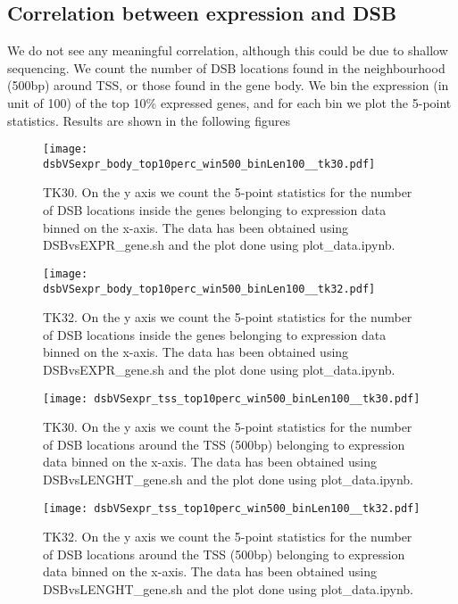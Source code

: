 \documentclass[11pt,a4paper]{article}
\begin{document}
\subsection{Correlation between expression and DSB}
We do not see any meaningful correlation, although this could be due to shallow sequencing. We count the number of DSB locations found in the neighbourhood (500bp) around TSS, or those found in the gene body. We bin the expression (in unit of 100) of the top 10\% expressed genes, and for each bin we plot the 5-point statistics. Results are shown in the following figures

\begin{figure}[hbtp]
\begin{minipage}[t]{0.45\textwidth}
\texttt{[image: dsbVSexpr\_body\_top10perc\_win500\_binLen100\_\_tk30.pdf]}
\caption{TK30. On the y axis we count the 5-point statistics for the number of DSB locations inside the genes belonging to expression data binned on the x-axis. The data has been obtained using DSBvsEXPR{\_}gene.sh and the plot done using plot{\_}data.ipynb.}
\label{fig:dsbVSexpr_body_top10perc_win500_binLen100__tk30}
\end{minipage}
\hspace{\fill}
\begin{minipage}[t]{0.5\textwidth}
\texttt{[image: dsbVSexpr\_body\_top10perc\_win500\_binLen100\_\_tk32.pdf]}
\caption{TK32. On the y axis we count the 5-point statistics for the number of DSB locations inside the genes belonging to expression data binned on the x-axis. The data has been obtained using DSBvsEXPR{\_}gene.sh and the plot done using plot{\_}data.ipynb.}
\label{fig:dsbVSexpr_body_top10perc_win500_binLen100__tk32}
\end{minipage}
\vspace*{0.5cm} %
\begin{minipage}[t]{0.45\textwidth}
\texttt{[image: dsbVSexpr\_tss\_top10perc\_win500\_binLen100\_\_tk30.pdf]}
\caption{TK30. On the y axis we count the 5-point statistics for the number of DSB locations around the TSS (500bp) belonging to expression data binned on the x-axis. The data has been obtained using DSBvsLENGHT{\_}gene.sh and the plot done using plot{\_}data.ipynb.}
\label{fig:dsbVSexpr_body_top10perc_win500_binLen100__tk30}
\end{minipage}
\hspace{\fill}
\begin{minipage}[t]{0.45\textwidth}
\texttt{[image: dsbVSexpr\_tss\_top10perc\_win500\_binLen100\_\_tk32.pdf]}
\caption{TK32. On the y axis we count the 5-point statistics for the number of DSB locations around the TSS (500bp) belonging to expression data binned on the x-axis. The data has been obtained using DSBvsLENGHT{\_}gene.sh and the plot done using plot{\_}data.ipynb.}
\label{fig:dsbVSexpr_body_top10perc_win500_binLen100__tk32}
\end{minipage}
\end{figure}
\end{document}
